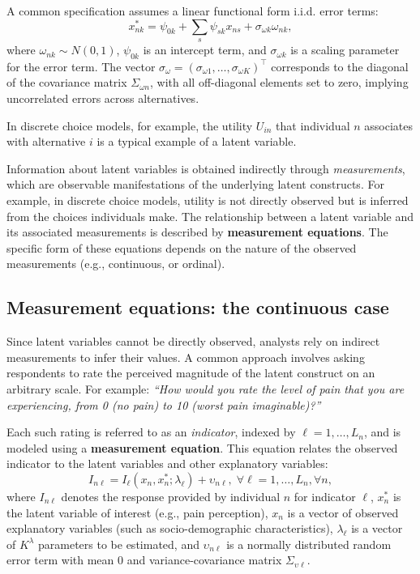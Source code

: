 \documentclass[12pt,a4paper]{article}
\begin{document}
A common specification assumes a linear functional form  i.i.d.   error terms:
\begin{equation}
\label{eq:linearStructural}
 x_{nk}^* = \psi_{0k} + \sum_s \psi_{sk} x_{ns} + \sigma_{\omega k} \omega_{nk},
\end{equation}
where $\omega_{nk} \sim N(0, 1)$, $\psi_{0k}$ is an intercept term, and $\sigma_{\omega k}$ is a scaling parameter for the error term. The vector $\sigma_\omega = (\sigma_{\omega 1}, \ldots, \sigma_{\omega K})^\top$ corresponds to the diagonal of the covariance matrix $\Sigma_{\omega n}$, with all off-diagonal elements set to zero, implying uncorrelated errors across alternatives.

In discrete choice models, for example, the utility $U_{in}$ that
individual $n$ associates with alternative $i$ is a typical example of
a latent variable.

Information about latent variables is obtained indirectly through
\emph{measurements}, which are observable manifestations of the
underlying latent constructs. For example, in discrete choice models,
utility is not directly observed but is inferred from the choices
individuals make. The relationship between a latent variable and its
associated measurements is described by \textbf{measurement
  equations}. The specific form of these equations depends on the
nature of the observed measurements (e.g., continuous, or ordinal).


\subsection{Measurement equations: the continuous case}

Since latent variables cannot be directly observed, analysts rely on
indirect measurements to infer their values. A common approach
involves asking respondents to rate the perceived magnitude of the
latent construct on an arbitrary scale. For example: \emph{``How would
you rate the level of pain that you are experiencing, from 0 (no pain)
to 10 (worst pain imaginable)?''}

Each such rating is referred to as an \emph{indicator}, indexed by
$\ell=1, \ldots, L_n$, and is modeled using a \textbf{measurement equation}. This
equation relates the observed indicator to the latent variables and
other explanatory variables:
\begin{equation}
\label{eq:continuousMeasurement}
I_{n\ell} = I_\ell(x_n, x_n^*;\lambda_\ell) + \upsilon_{n\ell}, \; \forall \ell=1, \ldots, L_n, \forall n,
\end{equation}
where $I_{n\ell}$ denotes the response provided by individual $n$ for
indicator $\ell$, $x_n^*$ is the latent variable of interest (e.g., pain
perception), $x_n$ is a vector of observed explanatory variables (such as
socio-demographic characteristics), $\lambda_\ell$ is a vector of $K^\lambda$
parameters to be estimated, and $\upsilon_{n\ell}$ is a normally distributed random error term with mean 0 and variance-covariance matrix $\Sigma_{\upsilon \ell}$. 
\end{document}
